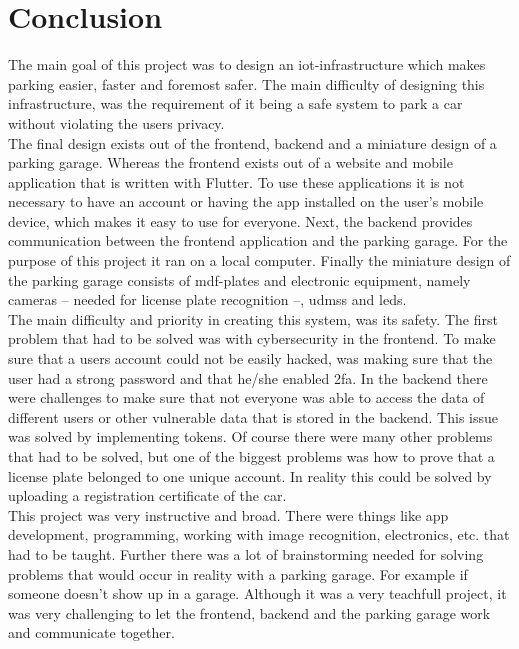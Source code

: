 \section{Conclusion}\label{sec:coclusion}
The main goal of this project was to design an \ac{iot}-infrastructure which makes parking easier, faster and foremost safer. The main difficulty of designing this infrastructure, was the requirement of it being a safe system to park a car without violating the users privacy.\\

The final design exists out of the frontend, backend and a miniature design of a parking garage. Whereas the frontend exists out of a website and mobile application that is written with Flutter. To use these applications it is not necessary to have an account or having the app installed on the user's mobile device, which makes it easy to use for everyone. Next, the backend provides communication between the frontend application and the parking garage. For the purpose of this project it ran on a local computer. Finally the miniature design of the parking garage consists of \ac{mdf}-plates and electronic equipment, namely cameras -- needed for license plate recognition --, \acp{udms} and \acp{led}. \\

The main difficulty and priority in creating this system, was its safety. The first problem that had to be solved was with cybersecurity in the frontend. To make sure that a users account could not be easily hacked, was making sure that the user had a strong password and that he/she enabled \ac{2fa}. In the backend there were challenges to make sure that not everyone was able to access the data of different users or other vulnerable data that is stored in the backend. This issue was solved by implementing tokens. Of course there were many other problems that had to be solved, but one of the biggest problems was how to prove that a license plate belonged to one unique account. In reality this could be solved by uploading a registration certificate of the car.
\\

This project was very instructive and broad. There were things like app development, programming, working with image recognition, electronics, etc. that had to be taught. Further there was a lot of brainstorming needed for solving problems that would occur in reality with a parking garage. For example if someone doesn't show up in a garage. Although it was a very teachfull project, it was very challenging to let the frontend, backend and the parking garage work and communicate together.
